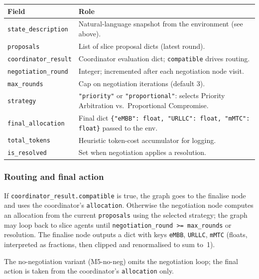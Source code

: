 \begin{table}[h]
\centering
\small
\begin{tabular}{@{}p{3.6cm}p{9.8cm}@{}}
\hline
\textbf{Field} & \textbf{Role} \\
\hline
\texttt{state\_description} &
Natural-language snapshot from the environment (see above). \\
\texttt{proposals} &
List of slice proposal dicts (latest round). \\
\texttt{coordinator\_result} &
Coordinator evaluation dict; \texttt{compatible} drives routing. \\
\texttt{negotiation\_round} &
Integer; incremented after each negotiation node visit. \\
\texttt{max\_rounds} &
Cap on negotiation iterations (default 3). \\
\texttt{strategy} &
\texttt{"priority"} or \texttt{"proportional"}: selects
Priority Arbitration vs.\ Proportional Compromise. \\
\texttt{final\_allocation} &
Final dict \texttt{\{"eMBB": float, "URLLC": float, "mMTC": float\}} passed to the env. \\
\texttt{total\_tokens} &
Heuristic token-cost accumulator for logging. \\
\texttt{is\_resolved} &
Set when negotiation applies a resolution. \\
\hline
\end{tabular}
\end{table}

\subsubsection*{Routing and final action}

If \texttt{coordinator\_result.compatible} is true, the graph goes to
the finalise node and uses the coordinator's \texttt{allocation}. Otherwise the
negotiation node computes an allocation from the current
\texttt{proposals} using the selected strategy; the graph may loop back to slice
agents until \texttt{negotiation\_round >= max\_rounds} or resolution. The
finalise node outputs a dict with keys \texttt{eMBB}, \texttt{URLLC},
\texttt{mMTC} (floats, interpreted as fractions, then clipped and
renormalised to sum to~1).

The no-negotiation variant (M5-no-neg) omits the negotiation loop; the
final action is taken from the coordinator's \texttt{allocation} only.
